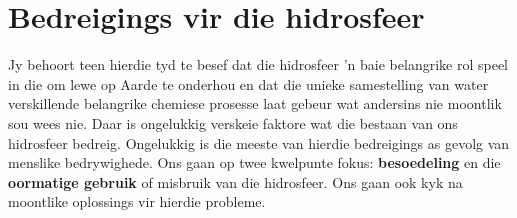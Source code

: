 \section{Bedreigings vir die hidrosfeer}
            \nopagebreak

Jy behoort teen hierdie tyd te besef dat die hidrosfeer   'n baie belangrike rol speel in die om lewe op Aarde te onderhou en dat die unieke samestelling van water verskillende belangrike chemiese prosesse laat gebeur wat andersins nie moontlik sou wees nie. Daar is ongelukkig verskeie faktore wat die bestaan van ons hidrosfeer bedreig. Ongelukkig is die meeste van hierdie bedreigings as gevolg van menslike bedrywighede. Ons gaan op twee kwelpunte fokus: \textbf{besoedeling} en die \textbf{oormatige gebruik} of misbruik van die hidrosfeer. Ons gaan ook kyk na moontlike oplossings vir hierdie probleme.

 \\

